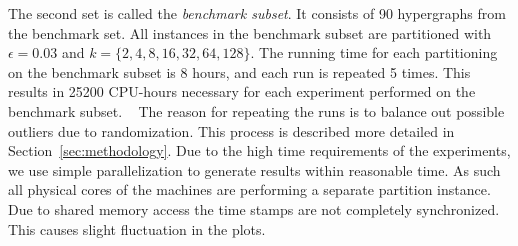 \documentclass[a4paper,12pt,titlepage, BCOR7mm,headsepline]{scrbook}
\numberwithin{equation}{section}
\begin{document}
The second set is called the \emph{benchmark subset}. It consists of 90 hypergraphs from the benchmark set. All instances in the benchmark subset are partitioned with $\epsilon = 0.03$ and $k = \{2,4,8,16,32,64,128\}$. The running time for each partitioning on the benchmark subset is 8 hours, and each run is repeated 5 times. This results in 25200 CPU-hours necessary for each experiment performed on the benchmark subset.
\newline ~ \newline
The reason for repeating the runs is to balance out possible outliers due to randomization. This process is described more detailed in Section~\ref{sec:methodology}.
Due to the high time requirements of the experiments, we use simple parallelization to generate results within reasonable time. As such all physical cores of the machines are performing a separate partition instance. Due to shared memory access the time stamps are not completely synchronized. This causes slight fluctuation in the plots. 
\end{document}
